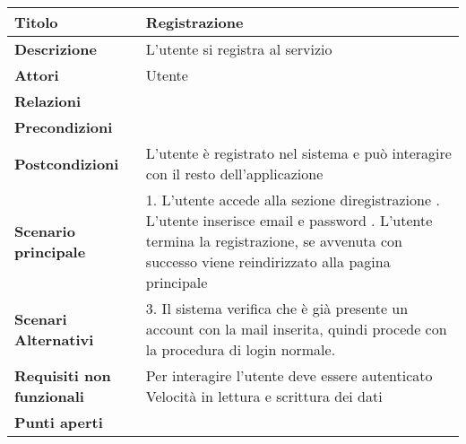 \begin{tabular} {|P{4.5cm}|P{11cm}|}
  \hline
  \textbf{Titolo}                   & Registrazione                                                                            \\
  \hline
  \textbf{Descrizione}              & L'utente si registra al servizio                                                         \\
  \hline
  \textbf{Attori}                   & Utente                                                                                   \\
  \hline
  \textbf{Relazioni}                &                                                                                          \\
  \hline
  \textbf{Precondizioni}            &                                                                                          \\
  \hline
  \textbf{Postcondizioni}           & L'utente è registrato nel sistema e può interagire con il resto dell'applicazione        \\
  \hline
  \textbf{Scenario principale}      &
  1. L'utente accede alla sezione diregistrazione . L'utente inserisce email e  password . L'utente termina la registrazione, se avvenuta con successo viene reindirizzato alla pagina principale                    \\
  \hline
  \textbf{Scenari Alternativi}      &
  3. Il sistema verifica che è già presente un account con la mail inserita, quindi procede con la procedura di login normale. \\
  \hline
  \textbf{Requisiti non funzionali} &
  Per interagire l’utente deve essere autenticato \linebreak
  Velocità in lettura e scrittura dei dati                                                                                     \\
  \hline
  \textbf{Punti aperti}             &                                                                                          \\
  \hline
\end{tabular}
\hfill
\break

